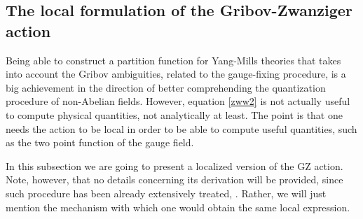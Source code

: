 \subsection{The local formulation of the Gribov-Zwanziger action}

Being able to construct a partition function for Yang-Mills theories that takes into account
the Gribov ambiguities, related to the gauge-fixing procedure, is a big achievement in the
direction of better comprehending the quantization procedure of non-Abelian fields. However,
equation \eqref{zww2} is not actually useful to compute physical quantities, not analytically
at least. The point is that one needs the action to be local in order to be able to compute
useful quantities, such as the two point function of the gauge field.

In this subsection we are going to present a localized version of the GZ action. Note, however,
that no details concerning its derivation will be provided, since such procedure has been
already extensively treated, \cite{Vandersickel:2012tz}. Rather, we will just mention the
mechanism with which one would obtain the same local expression.

